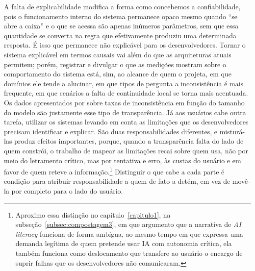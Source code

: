 A falta de explicabilidade modifica a forma como concebemos a confiabilidade, pois o funcionamento interno do sistema permanece opaco mesmo quando “se abre a caixa” e o que se acessa são apenas inúmeros parâmetros, sem que essa quantidade se converta na regra que efetivamente produziu uma determinada resposta. É isso que permanece não explicável para os desenvolvedores. Tornar o sistema explicável em termos causais vai além do que as arquiteturas atuais permitem; porém, registrar e divulgar o que as medições mostram sobre o comportamento do sistema está, sim, ao alcance de quem o projeta, em que domínios ele tende a alucinar, em que tipos de pergunta a inconsistência é mais frequente, em que cenários a falta de continuidade local se torna mais acentuada. Os dados apresentados por \textcite{Pinhanez2025Small} sobre taxas de inconsistência em função do tamanho do modelo são justamente esse tipo de transparência. Já aos usuários cabe outra tarefa, utilizar os sistemas levando em conta as limitações que os desenvolvedores precisam identificar e explicar. São duas responsabilidades diferentes, e misturá-las produz efeitos importantes, porque, quando a transparência falta do lado de quem constrói, o trabalho de mapear as limitações recai sobre quem usa, não por meio do letramento crítico, mas por tentativa e erro, às custas do usuário e em favor de quem reteve a informação.\footnote{Aproximo essa distinção no capítulo~\ref{capitulo1}, na subseção~\ref{subsec:compostagem3}, em que argumento que a narrativa de \emph{AI literacy} funciona de forma ambígua, ao mesmo tempo em que expressa uma demanda legítima de quem pretende usar IA com autonomia crítica, ela também funciona como deslocamento que transfere ao usuário o encargo de suprir falhas que os desenvolvedores não comunicaram.} Distinguir o que cabe a cada parte é condição para atribuir responsabilidade a quem de fato a detém, em vez de movê-la por completo para o lado do usuário.

